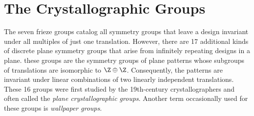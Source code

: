 \section{The Crystallographic Groups}

\begin{remark}
	The seven frieze groups catalog all symmetry groups that leave a design invariant under all multiples of just one translation. However, there are 17 additional kinds of discrete plane symmetry groups that arise from infinitely repeating designs in a plane. these groups are the symmetry groups of plane patterns whose subgroups of translations are isomorphic to $\Z \oplus \Z$. Consequently, the patterns are invariant under linear combinations of two linearly independent translations. These 16 groups were first studied by the 19th-century crystallographers and often called the \textit{plane crystallographic groups}. Another term occasionally used for these groups is \textit{wallpaper groups}.
\end{remark}
